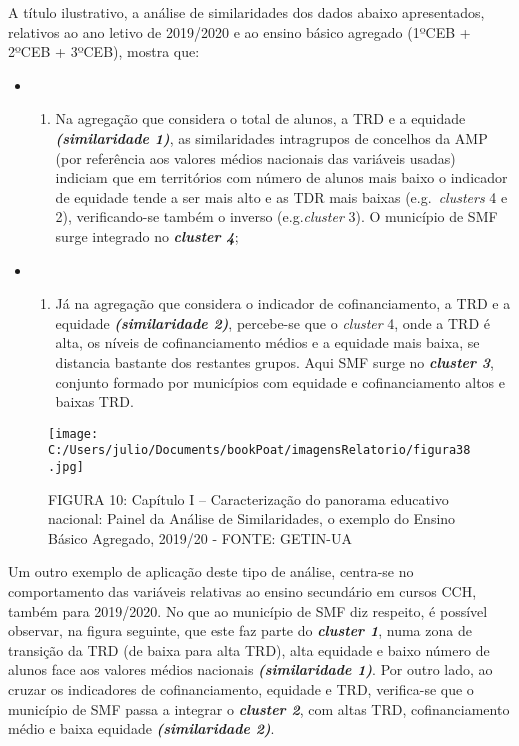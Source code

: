 \documentclass[
]{book}
\providecommand{\tightlist}{%
  \setlength{\itemsep}{0pt}\setlength{\parskip}{0pt}}
\begin{document}
A título ilustrativo, a análise de similaridades dos dados abaixo apresentados, relativos ao ano letivo de 2019/2020 e ao ensino básico agregado (1ºCEB + 2ºCEB + 3ºCEB), mostra que:

\begin{itemize}
\item
  \begin{enumerate}
  \def\labelenumi{\roman{enumi})}
  \tightlist
  \item
    Na agregação que considera o total de alunos, a TRD e a equidade \textbf{\emph{(similaridade 1)}}, as similaridades intragrupos de concelhos da AMP (por referência aos valores médios nacionais das variáveis usadas) indiciam que em territórios com número de alunos mais baixo o indicador de equidade tende a ser mais alto e as TDR mais baixas (e.g.~\emph{clusters} 4 e 2), verificando-se também o inverso (e.g.\emph{cluster} 3). O município de SMF surge integrado no \textbf{\emph{cluster 4}};
  \end{enumerate}
\item
  \begin{enumerate}
  \def\labelenumi{\roman{enumi})}
  \setcounter{enumi}{1}
  \tightlist
  \item
    Já na agregação que considera o indicador de cofinanciamento, a TRD e a equidade \textbf{\emph{(similaridade 2)}}, percebe-se que o \emph{cluster} 4, onde a TRD é alta, os níveis de cofinanciamento médios e a equidade mais baixa, se distancia bastante dos restantes grupos. Aqui SMF surge no \textbf{\emph{cluster 3}}, conjunto formado por municípios com equidade e cofinanciamento altos e baixas TRD.
  \end{enumerate}
\end{itemize}

\begin{figure}
\centering
\texttt{[image: C:/Users/julio/Documents/bookPoat/imagensRelatorio/figura38.jpg]}
\caption{FIGURA 10: Capítulo I -- Caracterização do panorama educativo nacional: Painel da Análise de Similaridades, o exemplo do Ensino Básico Agregado, 2019/20 - FONTE: GETIN-UA}
\end{figure}

Um outro exemplo de aplicação deste tipo de análise, centra-se no comportamento das variáveis relativas ao ensino secundário em cursos CCH, também para 2019/2020. No que ao município de SMF diz respeito, é possível observar, na figura seguinte, que este faz parte do \textbf{\emph{cluster 1}}, numa zona de transição da TRD (de baixa para alta TRD), alta equidade e baixo número de alunos face aos valores médios nacionais \textbf{\emph{(similaridade 1)}}. Por outro lado, ao cruzar os indicadores de cofinanciamento, equidade e TRD, verifica-se que o município de SMF passa a integrar o \textbf{\emph{cluster 2}}, com altas TRD, cofinanciamento médio e baixa equidade \textbf{\emph{(similaridade 2)}}.
\end{document}
